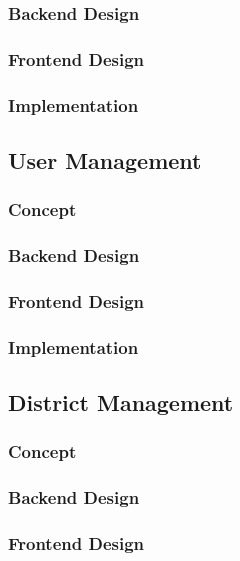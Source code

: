 \subsubsection{Backend Design}

\subsubsection{Frontend Design}

\subsubsection{Implementation}

\subsection{User Management}

\subsubsection{Concept}

\subsubsection{Backend Design}

\subsubsection{Frontend Design}

\subsubsection{Implementation}

\subsection{District Management}

\subsubsection{Concept}

\subsubsection{Backend Design}

\subsubsection{Frontend Design}

